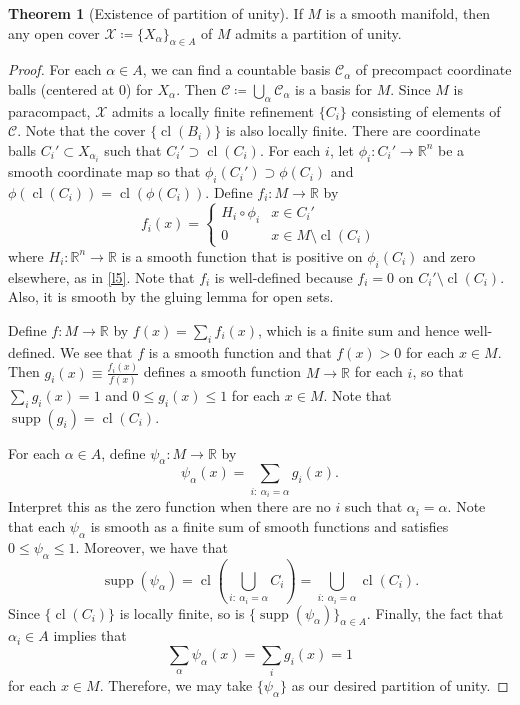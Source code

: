 \documentclass[10pt,letterpaper,cm]{nupset}
\theoremstyle{definition}
\theoremstyle{theorem}
\newtheorem{theorem}[definition]{Theorem}
\theoremstyle{remark}
\newcommand{\R}{\mathbb R}
\newcommand{\1}{\mathbf{1}}
\newcommand{\0}{\vec 0}
\DeclareMathOperator{\supp}{supp}
\DeclareMathOperator{\cl}{cl}
\begin{document}
\begin{theorem}[Existence of partition of unity]
If $M$ is a smooth manifold, then any open cover $\mathcal{X}\coloneqq \{X_{\alpha}\}_{\alpha \in A}$ of $M$ admits a partition of unity. 
\end{theorem}
\begin{proof}
For each $\alpha \in A$, we can find a countable basis $\mathcal{C}_{\alpha}$ of precompact  coordinate balls (centered at $0$) for $X_{\alpha}$. Then $\mathcal{C}\coloneqq \bigcup_{\alpha} \mathcal{C}_{\alpha}$ is a basis for $M$. Since $M$ is paracompact, $\mathcal{X}$ admits a locally finite refinement $\{C_i\}$ consisting of elements of $\mathcal{C}$. Note that the cover $\{\cl(B_i)\}$ is also locally finite. There are coordinate balls $C_i' \subset X_{\alpha_i}$ such that $ C_i'\supset \cl(C_i)$. For each $i$, let $\phi_i : C_i' \to \R^n$ be a smooth coordinate map so that $\phi_i(C_i') \supset \phi(C_i)$ and $\phi(\cl(C_i)) = \cl\left(\phi(C_i)\right)$. Define $f_i: M \to \R$ by $$f_i(x) = \begin{cases}  H_i \circ \phi_i &   x\in C_i' \\ 0 & x \in M \setminus \cl(C_i)    \end{cases}      $$ where $H_i: \R^n \to \R$ is a smooth function that is positive on $\phi_i(C_i)$ and zero elsewhere, as in \cref{l5}. Note that $f_i$ is well-defined because $f_i=0$ on $C_i' \setminus \cl(C_i)$. Also, it is smooth by the gluing lemma for open sets. 

\medskip


Define $f: M \to \R$ by $f(x) = \sum_{i}f_i(x)$, which is a finite sum and hence well-defined. We see that $f$ is a smooth function and that $f(x) >0$ for each $x\in M$. Then $g_i(x) \equiv \frac{f_i(x)}{f(x)}$ defines a smooth function $M \to \R$ for each $i$, so that $\sum_i g_i(x) = 1$ and $0\leq g_i(x) \leq 1$ for each $x\in M$. Note that $\supp(g_i) = \cl(C_i)$. 

\medskip


For each $\alpha \in A$, define $\psi_{\alpha} : M \to \R$ by $$\psi_{\alpha}(x) = \sum_{i:\ \alpha_i=\alpha}g_i(x)     .$$ Interpret this as the zero function when there are no $i$ such that $\alpha_i = \alpha$.  Note that each $\psi_{\alpha}$ is smooth as a finite sum of smooth functions and satisfies $0\leq  \psi_{\alpha} \leq 1$. Moreover, we have that $$\supp(\psi_{\alpha}) = \cl \left(\bigcup_{i:\ \alpha_i=\alpha} C_i \right)= \bigcup_{i:\ \alpha_i=\alpha} \cl(C_i). $$ Since $\{\cl(C_i)\}$ is locally finite, so is $\{\supp(\psi_{\alpha})\}_{\alpha \in A}$. Finally, the fact that $\alpha_i \in A$ implies that $$\sum_{\alpha} \psi_{\alpha}(x) = \sum_i g_i(x) =1$$ for each $x\in M$. Therefore, we may take $\{\psi_{\alpha}\}$ as our desired partition of unity. 
\end{proof}
\end{document}
